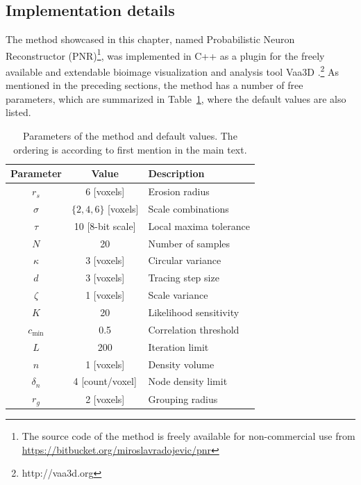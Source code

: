 \subsection{Implementation details}
\label{subsec:implementation}
The method showcased in this chapter, named Probabilistic Neuron Reconstructor (PNR)\footnote{The source code of the method is freely available for non-commercial use from \url{https://bitbucket.org/miroslavradojevic/pnr}}, was implemented in C++ as a plugin for the freely available and extendable bioimage visualization and analysis tool Vaa3D \cite{peng2010v3d, peng2014extensible}.\footnote{http://vaa3d.org} As mentioned in the preceding sections, the method has a number of free parameters, which are summarized in Table~\ref{tab:params}, where the default values are also listed.
\begin{table}
	\small\centering
	\begin{tabular}{@{}c@{\hspace{1em}}c@{\hspace{2em}}l@{}}
		\hline
		Parameter & Value & Description \\
		\hline
		$r_s$ & 6 [voxels] & Erosion radius \\
		$\sigma$ & $\{ 2,4,6 \}$ [voxels]  & Scale combinations \\ %
		$\tau$ & 10 [8-bit scale] & Local maxima tolerance \\ %
		$N$ & 20 & Number of samples \\
		$\kappa$ & 3 [voxels] & Circular variance \\
		$d$ & 3 [voxels] & Tracing step size \\
		$\zeta$ & 1 [voxels] & Scale variance \\
		$K$ & 20 & Likelihood sensitivity \\
		$c_{\text{min}}$ & 0.5 & Correlation threshold \\ %
		$L$ & 200 & Iteration limit \\
		$n$ & 1 [voxels] & Density volume \\
		$\delta_n$ & 4 [count/voxel] & Node density limit \\
		$r_g$ & 2 [voxels] & Grouping radius \\
		\hline
	\end{tabular}
	\caption{Parameters of the method and default values. The ordering is according to first mention in the main text.}
	\label{tab:params}
\end{table}

